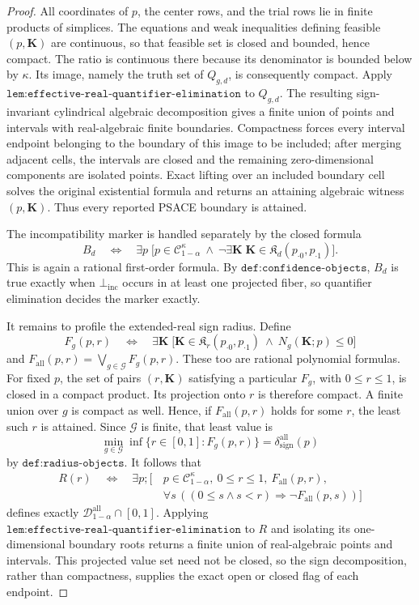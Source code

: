 \documentclass{article}
\begin{document}
\begin{proof}
All coordinates of \(p\), the center rows, and the trial rows lie in finite products of simplices.  The equations and weak inequalities defining feasible \((p,\mathbf K)\) are continuous, so that feasible set is closed and bounded, hence compact.  The ratio is continuous there because its denominator is bounded below by \(\kappa\).  Its image, namely the truth set of \(Q_{g,d}\), is consequently compact.  Apply \(\texttt{lem:effective-real-quantifier-elimination}\) to \(Q_{g,d}\).  The resulting sign-invariant cylindrical algebraic decomposition gives a finite union of points and intervals with real-algebraic finite boundaries.  Compactness forces every interval endpoint belonging to the boundary of this image to be included; after merging adjacent cells, the intervals are closed and the remaining zero-dimensional components are isolated points.  Exact lifting over an included boundary cell solves the original existential formula and returns an attaining algebraic witness \((p,\mathbf K)\).  Thus every reported PSACE boundary is attained.

The incompatibility marker is handled separately by the closed formula
\[
 B_d\quad\Longleftrightarrow\quad
 \exists p\;\bigl[p\in\mathcal C_{1-\alpha}^{\kappa}\ \wedge\ 
 \neg\exists\mathbf K\;\mathbf K\in
 \mathfrak K_d(p_{\cdot0},p_{\cdot1})\bigr].
\]
This is again a rational first-order formula.  By \(\texttt{def:confidence-objects}\), \(B_d\) is true exactly when \(\bot_{\mathrm{inc}}\) occurs in at least one projected fiber, so quantifier elimination decides the marker exactly.

It remains to profile the extended-real sign radius.  Define
\[
 F_g(p,r)\quad\Longleftrightarrow\quad
 \exists\mathbf K\;\bigl[
 \mathbf K\in\mathfrak K_r(p_{\cdot0},p_{\cdot1})\ \wedge\ 
 N_g(\mathbf K;p)\le0\bigr]
\]
and \(F_{\mathrm{all}}(p,r)=\bigvee_{g\in\mathcal G}F_g(p,r)\).  These too are rational polynomial formulas.  For fixed \(p\), the set of pairs \((r,\mathbf K)\) satisfying a particular \(F_g\), with \(0\le r\le1\), is closed in a compact product.  Its projection onto \(r\) is therefore compact.  A finite union over \(g\) is compact as well.  Hence, if \(F_{\mathrm{all}}(p,r)\) holds for some \(r\), the least such \(r\) is attained.  Since \(\mathcal G\) is finite, that least value is
\[
 \min_{g\in\mathcal G}\inf\{r\in[0,1]:F_g(p,r)\}
 =\delta_{\mathrm{sign}}^{\mathrm{all}}(p)
\]
by \(\texttt{def:radius-objects}\).  It follows that
\[
\begin{split}
 R(r)\quad\Longleftrightarrow\quad \exists p;[\,&p\in\mathcal C_{1-\alpha}^{\kappa},\ 
 0\le r\le1,\ F_{\mathrm{all}}(p,r),\\
 &\forall s\,((0\le s\wedge s<r)\Longrightarrow
 \neg F_{\mathrm{all}}(p,s))]
\end{split}
\]
defines exactly \(\mathcal D_{1-\alpha}^{\mathrm{all}}\cap[0,1]\).  Applying \(\texttt{lem:effective-real-quantifier-elimination}\) to \(R\) and isolating its one-dimensional boundary roots returns a finite union of real-algebraic points and intervals.  This projected value set need not be closed, so the sign decomposition, rather than compactness, supplies the exact open or closed flag of each endpoint.


\end{proof}
\end{document}
